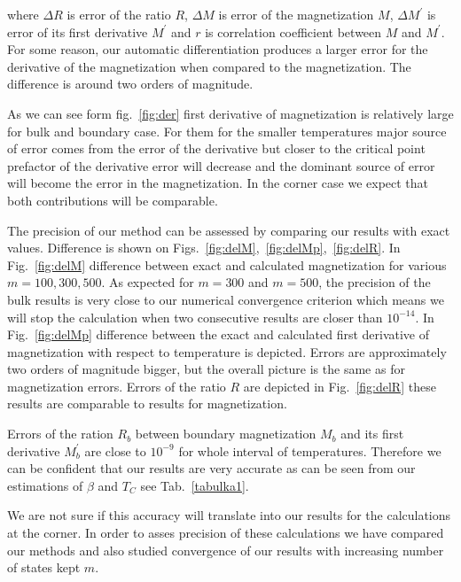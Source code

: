 \documentclass[showpacs,amssymb,twocolumn,floatfix,aps,pre,notitlepage]{revtex4-2}
\begin{document}
where $\Delta R$ is error of the ratio $R$, $\Delta M$ is error of the magnetization $M$, $\Delta M^\prime$ is error of its first derivative $M^\prime$ and $r$ is correlation coefficient between $M$ and $M^\prime$. For some reason, our automatic differentiation produces a larger error for the derivative of the magnetization when compared to the magnetization. The difference is around two orders of magnitude.

As we can see form fig.~\ref{fig:der} first derivative of magnetization is relatively large for bulk and boundary case. For them for the smaller temperatures major source of error comes from the error of the derivative but closer to the critical point prefactor of the derivative error will decrease and the dominant source of error will become the error in the magnetization. In the corner case we expect that both contributions will be comparable.

The precision of our method can be assessed by comparing our results with exact values. Difference is shown on Figs.~\ref{fig:delM},~\ref{fig:delMp},~\ref{fig:delR}. In Fig.~\ref{fig:delM} difference between exact and calculated magnetization for various $m = 100,300,500$. As expected for $m=300$ and $m=500$, the precision of the bulk results is very close to our numerical convergence criterion which means we will stop the calculation when two consecutive results are closer than $10^{-14}$. In Fig.~\ref{fig:delMp} difference between the exact and calculated first derivative of magnetization with respect to temperature is depicted. Errors are approximately two orders of magnitude bigger, but the overall picture is the same as for magnetization errors. Errors of the ratio $R$ are depicted in Fig.~\ref{fig:delR} these results are comparable to results for magnetization.

Errors of the ration $R_b$ between boundary magnetization $M_b$ and its first derivative $M^{\prime}_b$ are close to $10^{-9}$ for whole interval of temperatures. Therefore we can be confident that our results are very accurate as can be seen from our estimations of $\beta$ and $T_C$ see Tab.~\ref{tabulka1}. 

We are not sure if this accuracy will translate into our results for the calculations at the corner. In order to asses precision of these calculations we have compared our methods and also studied convergence of our results with increasing number of states kept $m$. 


\end{document}

